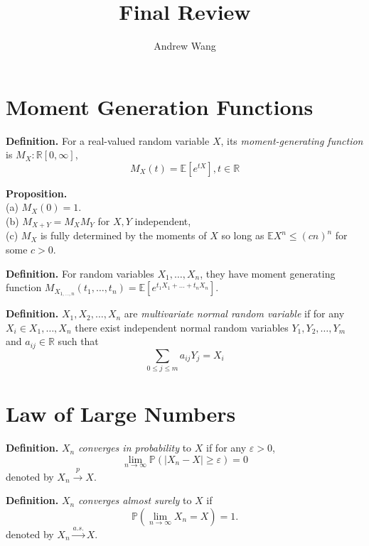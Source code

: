 \documentclass{article}
\title{Final Review}
\author{Andrew Wang}
\begin{document}
\maketitle

\section{Moment Generation Functions}

\textbf{Definition.} For a real-valued random variable $X$, its \emph{moment-generating function}
is $M_X: \mathbb{R} [0, \infty]$, $$M_X(t) = \mathbb{E}[e^{tX}], t \in \mathbb{R}$$

\par

\textbf{Proposition.} \\ 
(a) $M_X(0) = 1$. \\
(b) $M_{X+Y} = M_XM_Y$ for $X,Y$ independent, \\
(c) $M_X$ is fully determined by the moments of $X$ so long as 
  $\mathbb{E}{X^n}\leq(cn)^n$ for some $c >0$.


\par
\textbf{Definition.} For random variables $X_1, \dots, X_n$, they have moment generating function
$M_{X_{1, \dots, n}}(t_1, \dots, t_n) = \mathbb{E}[e^{t_1X_1 + \dots + t_nX_n}].$

\par

\textbf{Definition.} $X_1, X_2, \dots, X_n$ are \emph{multivariate normal random variable} if for any $X_i \in {X_1, \dots, X_n}$
                     there exist independent normal random variables $Y_1, Y_2, \dots, Y_m$ and $a_{ij} \in \mathbb{R}$ such that
                     $$\sum_{0\leq j \leq m}a_{ij}Y_j = X_i$$


\section{Law of Large Numbers}

\textbf{Definition.} $X_n$ \emph{converges in probability} to $X$ if
                     for any $\varepsilon > 0$,
                     $$\lim_{n \to \infty}\mathbb{P}(|X_n-X| \geq \varepsilon) = 0 $$
                     denoted by $X_n \xrightarrow{p} X $.

\par

\textbf{Definition.} $X_n$ \emph{converges almost surely} to $X$ if 
                     $$\mathbb{P}(\lim_{n \to \infty}X_n = X) = 1.$$
                     denoted by $X_n \xrightarrow{a.s.} X.$
\end{document}
